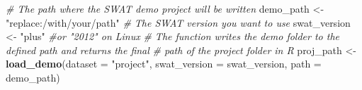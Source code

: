 \documentclass[11pt,]{article}
\newenvironment{Shaded}{\begin{snugshade}}{\end{snugshade}}
\newcommand{\KeywordTok}[1]{\textcolor[rgb]{0.13,0.29,0.53}{\textbf{#1}}}
\newcommand{\DataTypeTok}[1]{\textcolor[rgb]{0.13,0.29,0.53}{#1}}
\newcommand{\StringTok}[1]{\textcolor[rgb]{0.31,0.60,0.02}{#1}}
\newcommand{\CommentTok}[1]{\textcolor[rgb]{0.56,0.35,0.01}{\textit{#1}}}
\newcommand{\NormalTok}[1]{#1}
\begin{document}
\begin{Shaded}
\begin{Highlighting}[]
\CommentTok{# The path where the SWAT demo project will be written}
\NormalTok{demo_path <-}\StringTok{ "replace:/with/your/path"}
\CommentTok{# The SWAT version you want to use}
\NormalTok{swat_version <-}\StringTok{ "plus"} \CommentTok{#or "2012" on Linux}
\CommentTok{# The function writes the demo folder to the defined path and returns the final}
\CommentTok{# path of the project folder in R}
\NormalTok{proj_path <-}\StringTok{ }\KeywordTok{load_demo}\NormalTok{(}\DataTypeTok{dataset =} \StringTok{"project"}\NormalTok{, }
                       \DataTypeTok{swat_version =}\NormalTok{ swat_version, }
                       \DataTypeTok{path =}\NormalTok{ demo_path)}
\end{Highlighting}
\end{Shaded}
\newpage
\singlespacing
\end{document}
